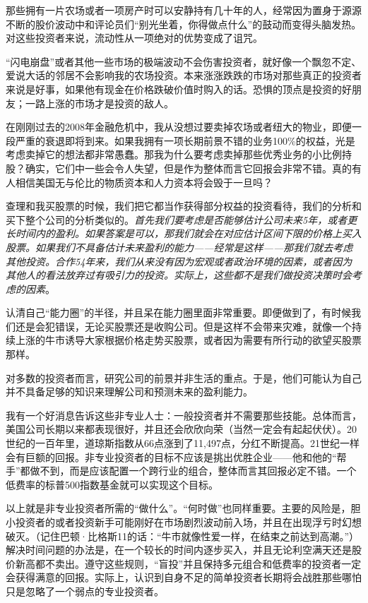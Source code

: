 \documentclass[UTF8,a4paper,zihao=-4,fontset = windows]{ctexart} %
\begin{document}
那些拥有一片农场或者一项房产时可以安静持有几十年的人，经常因为置身于源源不断的股价波动中和评论员们“别光坐着，你得做点什么”的鼓动而变得头脑发热。对这些投资者来说，流动性从一项绝对的优势变成了诅咒。

“闪电崩盘”或者其他一些市场的极端波动不会伤害投资者，就好像一个飘忽不定、爱说大话的邻居不会影响我的农场投资。本来涨涨跌跌的市场对那些真正的投资者来说是好事，如果他有现金在价格跌破价值时购入的话。恐惧的顶点是投资的好朋友；一路上涨的市场才是投资的敌人。

在刚刚过去的2008年金融危机中，我从没想过要卖掉农场或者纽大的物业，即便一段严重的衰退即将到来。如果我拥有一项长期前景不错的业务100\%的权益，光是考虑卖掉它的想法都非常愚蠢。那我为什么要考虑卖掉那些优秀业务的小比例持股？确实，它们中一些会令人失望，但是作为整体而言它回报会非常不错。真的有人相信美国无与伦比的物质资本和人力资本将会毁于一旦吗？

查理和我买股票的时候，我们把它都当作获得部分权益的投资看待，我们的分析和买下整个公司的分析类似的。\textit{首先我们要考虑是否能够估计公司未来5年，或者更长时间内的盈利。如果答案是可以，那我们就会在对应估计区间下限的价格上买入股票。如果我们不具备估计未来盈利的能力——经常是这样——那我们就去考虑其他投资。合作54年来，我们从来没有因为宏观或者政治环境的因素，或者因为其他人的看法放弃过有吸引力的投资。实际上，这些都不是我们做投资决策时会考虑的因素}。

认清自己“能力圈”的半径，并且呆在能力圈里面非常重要。即便做到了，有时候我们还是会犯错误，无论买股票还是收购公司。但是这样不会带来灾难，就像一个持续上涨的牛市诱导大家根据价格走势买股票，或者因为需要有所行动的欲望买股票那样。

对多数的投资者而言，研究公司的前景并非生活的重点。于是，他们可能认为自己并不具备足够的知识来理解公司和预测未来的盈利能力。

我有一个好消息告诉这些非专业人士：一般投资者并不需要那些技能。总体而言，美国公司长期以来都表现很好，并且还会欣欣向荣（当然一定会有起起伏伏）。20世纪的一百年里，道琼斯指数从66点涨到了11,497点，分红不断提高。21世纪一样会有巨额的回报。非专业投资者的目标不应该是挑出优胜企业——他和他的“帮手”都做不到，而是应该配置一个跨行业的组合，整体而言其回报必定不错。一个低费率的标普500指数基金就可以实现这个目标。

以上就是非专业投资者所需的“做什么”。“何时做”也同样重要。主要的风险是，胆小投资者的或者投资新手可能刚好在市场剧烈波动前入场，并且在出现浮亏时幻想破灭。（记住巴顿·比格斯11的话：“牛市就像性爱一样，在结束之前达到高潮。”）解决时间问题的办法是，在一个较长的时间内逐步买入，并且无论利空满天还是股价新高都不卖出。遵守这些规则，“盲投”并且保持多元组合和低费率的投资者一定会获得满意的回报。实际上，认识到自身不足的简单投资者长期将会战胜那些哪怕只是忽略了一个弱点的专业投资者。
\end{document}

